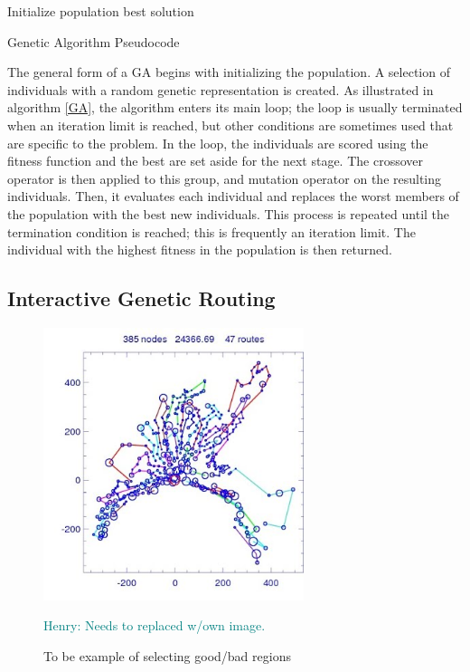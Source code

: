 \documentclass{sig-alternate}
\newcommand{\allcomments}[1]{{#1}}
\newcommand{\hfcomment}[1]{\textcolor{Teal}{\allcomments{Henry: {#1}}}}
\begin{document}
\begin{algorithm}
Initialize population\;
\Return best solution\;
\caption{Genetic Algorithm Pseudocode\label{GA}}
\end{algorithm}

The general form of a GA begins with initializing the population. A selection of individuals with a random genetic representation is created. As illustrated in algorithm \ref{GA}, the algorithm enters its main loop; the loop is usually terminated when an iteration limit is reached, but other conditions are sometimes used that are specific to the problem. In the loop, the individuals are scored using the fitness function and the best are set aside for the next stage. The crossover operator is then applied to this group, and mutation operator on the resulting individuals. Then, it evaluates each individual and replaces the worst members of the population with the best new individuals. This process is repeated until the termination condition is reached; this is frequently an iteration limit. The individual with the highest fitness in the population is then returned.
\subsection{Interactive Genetic Routing}

\begin{figure}[h]
\centering
\includegraphics[width=3in, keepaspectratio]{vrp2.jpg}
\caption{To be example of selecting good/bad regions}
\hfcomment{Needs to replaced w/own image.}
\label{fig:Humangraph}
\end{figure}
\end{document}
